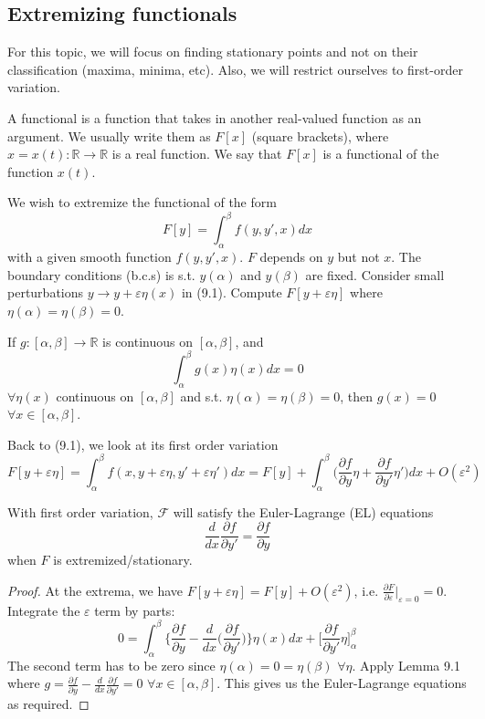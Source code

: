 \documentclass[a4paper]{article}
\begin{document}
\subsection{Extremizing functionals}
For this topic, we will focus on finding stationary points and not on their classification (maxima, minima, etc). Also, we will restrict ourselves to first-order variation.
\begin{defi}[Functional]
  A functional is a function that takes in another real-valued function as an argument. We usually write them as $F[x]$ (square brackets), where $x = x(t): \mathbb{R} \to \mathbb{R}$ is a real function. We say that $F[x]$ is a functional of the function $x(t)$.
\end{defi}
We wish to extremize the functional of the form
\begin{equation}
    F[y]=\int_\alpha^\beta f(y,y',x)dx\tag{9.1}
\end{equation}
with a given smooth function $f(y,y',x)$. $F$ depends on $y$ but not $x$. The boundary conditions (b.c.s) is s.t. $y(\alpha)$ and $y(\beta)$ are fixed. Consider small perturbations $y\rightarrow y+\varepsilon\eta(x)$ in (9.1). Compute $F[y+\varepsilon\eta]$ where $\eta(\alpha)=\eta(\beta)=0$.
\begin{lemma}
If $g:[\alpha,\beta]\rightarrow\mathbb{R}$ is continuous on $[\alpha,\beta]$, and
$$\int_\alpha^\beta g(x)\eta(x)dx=0$$
$\forall\eta(x)$ continuous on $[\alpha,\beta]$ and s.t. $\eta(\alpha)=\eta(\beta)=0$, then $g(x)=0$ $\forall x\in[\alpha,\beta]$.
\end{lemma}
Back to (9.1), we look at its first order variation
$$F[y+\varepsilon\eta]=\int_\alpha^\beta f(x,y+\varepsilon\eta,y'+\varepsilon\eta')dx=F[y]+\int_\alpha^\beta\bigg(\frac{\partial f}{\partial y}\eta+\frac{\partial f}{\partial y'}\eta'\bigg)dx+O(\varepsilon^2)$$
\begin{prop}
With first order variation, $\mathcal{F}$ will satisfy the Euler-Lagrange (EL) equations
\begin{equation}
\frac{d}{dx}\frac{\partial f}{\partial y'}=\frac{\partial f}{\partial y}\tag{9.2}
\end{equation}
when $F$ is extremized/stationary.
\end{prop}
\begin{proof}
At the extrema, we have $F[y+\varepsilon\eta]=F[y]+O(\varepsilon^2)$, i.e. $\frac{\partial F}{\partial\varepsilon}|_{\varepsilon=0}=0$. Integrate the $\varepsilon$ term by parts:
$$0=\int_\alpha^\beta\bigg\{\frac{\partial f}{\partial y}-\frac{d}{dx}\bigg(\frac{\partial f}{\partial y'}\bigg)\bigg\}\eta(x) dx+\bigg[\frac{\partial f}{\partial y'}\eta\bigg]_\alpha^\beta$$
The second term has to be zero since $\eta(\alpha)=0=\eta(\beta)$ $\forall\eta$. Apply Lemma 9.1 where $g=\frac{\partial f}{\partial y}-\frac{d}{dx}\frac{\partial f}{\partial y'}=0$ $\forall x\in[\alpha,\beta]$. This gives us the Euler-Lagrange equations as required.
\end{proof}
\end{document}
